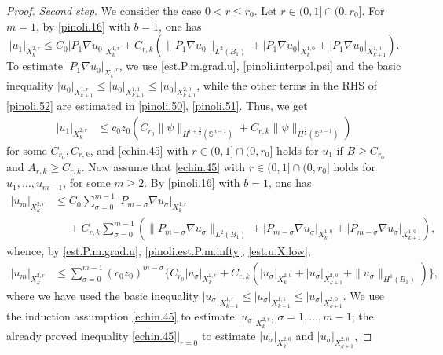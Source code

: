 \documentclass[10pt,reqno,a4paper]{article}
\numberwithin{equation}{section}
\theoremstyle{plain}
\theoremstyle{definition}
\renewcommand{\S}{{\mathbb S}}
\newcommand{\grad}{\nabla}
\begin{document}
\begin{proof}
\medskip

\emph{Second step}. 
We consider the case $0 < r \leq r_0$. 
Let $r \in (0,1] \cap (0, r_0]$. 
For $m=1$, by \eqref{pinoli.16} with $b=1$, one has 
\begin{equation} \label{pinoli.52}
|u_1|_{X^{2,r}_k} 
\leq C_0 |P_1 \grad u_0|_{X^{1,r}_k}
+ C_{r,k} ( \| P_1 \grad u_0 \|_{L^2(B_1)} 
+ |P_1 \grad u_0|_{X^{1,0}_k} + |P_1 \grad u_0|_{X^{1,0}_{k+1}} ). 
\end{equation}
To estimate $|P_1 \grad u_0|_{X^{1,r}_k}$, we use  
\eqref{est.P.m.grad.u}, \eqref{pinoli.interpol.psi}
and the basic inequality 
$|u_0|_{X^{1,r}_{k+1}} 
\leq |u_0|_{X^{1,1}_{k+1}}
\leq |u_0|_{X^{2,0}_{k+1}}$, 
while the other terms in the RHS of \eqref{pinoli.52} 
are estimated in \eqref{pinoli.50}, \eqref{pinoli.51}. 
Thus, we get 
\begin{align*}
|u_1|_{X^{2,r}_k} 
& \leq c_0 z_0 (C_{r_0} \| \psi \|_{H^{r+\frac32}(\S^{n-1})} 
+ C_{r,k} \| \psi \|_{H^{\frac32}(\S^{n-1})} )
\end{align*}
for some $C_{r_0}, C_{r,k}$, 
and \eqref{echin.45} with $r \in (0,1] \cap (0,r_0]$ holds for $u_1$ 
if $B \geq C_{r_0}$ and $A_{r,k} \geq C_{r,k}$. 
Now assume that \eqref{echin.45} with $r \in (0,1] \cap (0,r_0]$ holds for $u_1, \ldots, u_{m-1}$, 
for some $m \geq 2$. 
By \eqref{pinoli.16} with $b=1$, one has
\begin{align*}
|u_m|_{X^{2,r}_k} 
& \leq C_0 \sum_{\sigma = 0}^{m-1} |P_{m-\sigma} \grad u_\sigma|_{X^{1,r}_k} 
\\ & \quad \ 
+ C_{r,k} \sum_{\sigma = 0}^{m-1} ( \| P_{m-\sigma} \grad u_\sigma \|_{L^2(B_1)}
+ |P_{m-\sigma} \grad u_\sigma|_{X^{1,0}_{k}}
+ |P_{m-\sigma} \grad u_\sigma|_{X^{1,0}_{k+1}} ),
\end{align*}
whence, by \eqref{est.P.m.grad.u}, \eqref{pinoli.est.P.m.infty}, \eqref{est.u.X.low}, 
\begin{align*}
|u_m|_{X^{2,r}_k} 
& \leq \sum_{\sigma = 0}^{m-1} (c_0 z_0)^{m-\sigma} \{ C_{r_0} |u_\sigma|_{X^{2,r}_k} 
+ C_{r,k} ( |u_\sigma|_{X^{2,0}_{k}} + |u_\sigma|_{X^{2,0}_{k+1}} + \| u_\sigma \|_{H^1(B_1)} ) \},
\end{align*}
where we have used the basic inequality 
$|u_\sigma|_{X^{1,r}_{k+1}} \leq |u_\sigma|_{X^{1,1}_{k+1}} 
\leq |u_\sigma|_{X^{2,0}_{k+1}}$. 
We use the induction assumption \eqref{echin.45} 
to estimate $|u_\sigma|_{X^{2,r}_k}$, $\sigma = 1, \ldots, m-1$; 
the already proved inequality \eqref{echin.45}$|_{r=0}$ 
to estimate $|u_\sigma|_{X^{2,0}_k}$ and $|u_\sigma|_{X^{2,0}_{k+1}}$, 

\end{proof}
\end{document}
